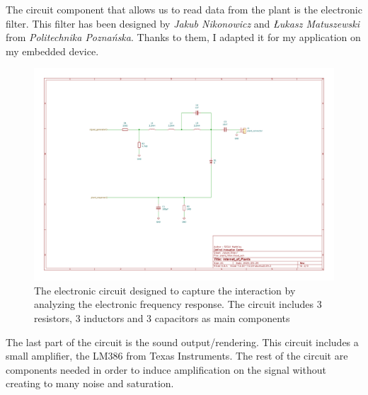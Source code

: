 The circuit component that allows us to read data from the plant is the electronic filter.
This filter has been designed by \textit{Jakub Nikonowicz} and \textit{Łukasz Matuszewski} 
from \textit{Politechnika Poznańska}.
Thanks to them, I adapted it for my application on my embedded device. 

\begin{figure}[h]
    \centering
    \includegraphics[width=\textwidth]{images/iop-plant_filter.pdf}
    \caption{The electronic circuit designed to capture the interaction by analyzing the electronic
    frequency response. The circuit includes 3 resistors, 3 inductors and 3 capacitors as main components} 
    \vspace{0.1cm}
    \label{fig:iop_schematic_filter}
\end{figure}

The last part of the circuit is the sound output/rendering. This circuit includes a small amplifier,
the LM386 from Texas Instruments. The rest of the circuit are components needed in order to 
induce amplification on the signal without creating to many noise and saturation.

